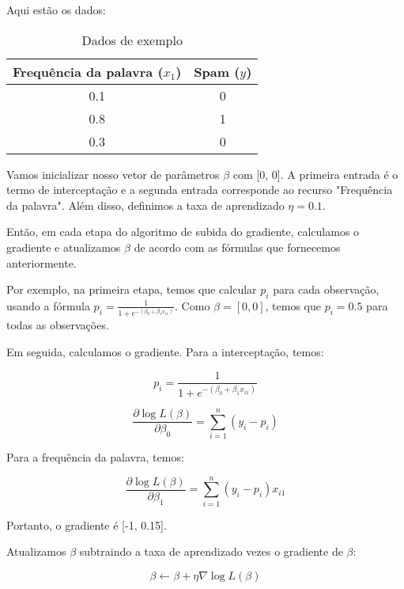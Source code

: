\documentclass[12pt,a4paper, brazil]{article}
\begin{document}
Aqui estão os dados:

\begin{table}[h]
  \centering
  \begin{tabular}{|c|c|}
  \hline
  Frequência da palavra ($x_1$) & Spam ($y$) \\ 
  \hline
  0.1 & 0 \\ 
  0.8 & 1 \\ 
  0.3 & 0 \\ 
  \hline
  \end{tabular}
  \caption{Dados de exemplo}
  \end{table}
  

Vamos inicializar nosso vetor de parâmetros $\beta$ com [0, 0]. A primeira entrada é o termo de interceptação e a segunda entrada corresponde ao recurso "Frequência da palavra". Além disso, definimos a taxa de aprendizado $\eta = 0.1$.

Então, em cada etapa do algoritmo de subida do gradiente, calculamos o gradiente e atualizamos $\beta$ de acordo com as fórmulas que fornecemos anteriormente.

Por exemplo, na primeira etapa, temos que calcular $p_i$ para cada observação, usando a fórmula $p_i = \frac{1}{1+e^{-(\beta_0 + \beta_1x_{i1})}}$. Como $\beta = [0, 0]$, temos que $p_i = 0.5$ para todas as observações.

Em seguida, calculamos o gradiente. Para a interceptação, temos:

\begin{equation}
  p_i = \frac{1}{1+e^{-(\beta_0 + \beta_1x_{i1})}}
  \end{equation}

  \begin{equation}
    \frac{\partial \log L(\beta)}{\partial \beta_0} = \sum_{i=1}^{n} (y_i - p_i)
    \end{equation}

Para a frequência da palavra, temos:

\begin{equation}
  \frac{\partial \log L(\beta)}{\partial \beta_1} = \sum_{i=1}^{n} (y_i - p_i)x_{i1}
  \end{equation}
  

Portanto, o gradiente é [-1, 0.15].

Atualizamos $\beta$ subtraindo a taxa de aprendizado vezes o gradiente de $\beta$:

\begin{equation}
  \beta \leftarrow \beta + \eta \nabla \log L(\beta)
\end{equation}
\end{document}
